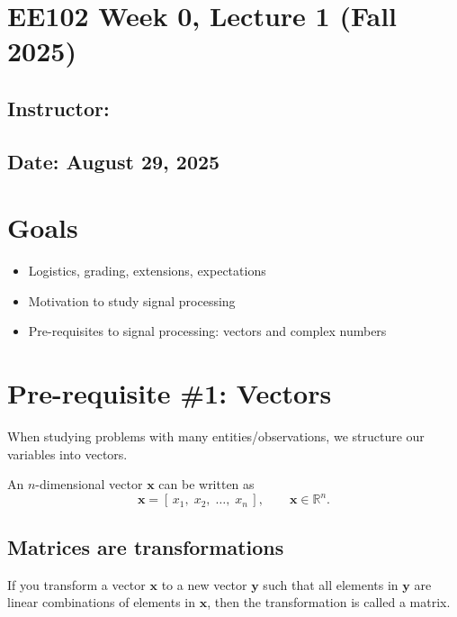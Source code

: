\documentclass{ee102_notes}
\renewcommand{\releasedate}{August 29, 2025}
\begin{document}
\section*{EE102 Week 0, Lecture 1 (Fall 2025)}
\subsection*{Instructor: \instructor}
\subsection*{Date: \releasedate}
\section{Goals}
\begin{itemize}
  \item Logistics, grading, extensions, expectations
  \item Motivation to study signal processing
  \item Pre-requisites to signal processing: vectors and complex numbers
\end{itemize}

\section{Pre-requisite \#1: Vectors}
When studying problems with many entities/observations, we structure our variables into vectors.

An $n$-dimensional vector $\mathbf{x}$ can be written as
\[
\mathbf{x}=[\,x_1,\;x_2,\;\ldots,\;x_n\,], \qquad \mathbf{x}\in\mathbb{R}^n .
\]

\subsection{Matrices are transformations}
If you transform a vector $\mathbf{x}$ to a new vector $\mathbf{y}$ such that all elements in $\mathbf{y}$ are linear combinations of elements in $\mathbf{x}$, then the transformation is called a matrix.
\end{document}
